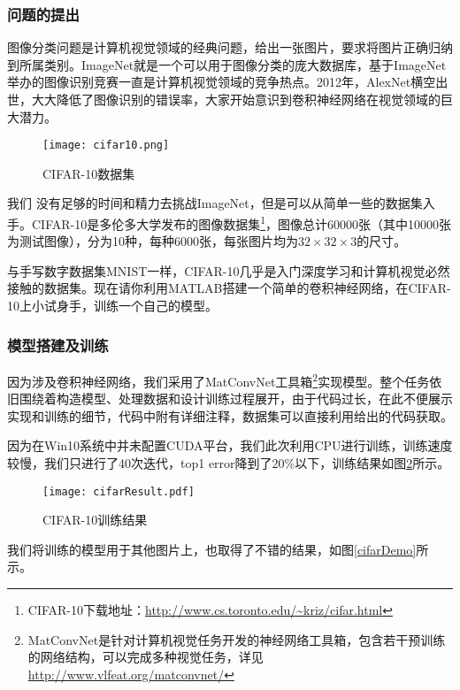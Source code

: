 \documentclass[bwprint]{cumcmthesis}
\begin{document}
\subsubsection{问题的提出}

图像分类问题是计算机视觉领域的经典问题，给出一张图片，要求将图片正确归纳到所属类别。ImageNet就是一个可以用于图像分类的庞大数据库，基于ImageNet举办的图像识别竞赛一直是计算机视觉领域的竞争热点。2012年，AlexNet横空出世，大大降低了图像识别的错误率，大家开始意识到卷积神经网络在视觉领域的巨大潜力。

\begin{figure}[!h]
	\centering
	\texttt{[image: cifar10.png]}
	\caption{CIFAR-10数据集}
	\label{cifar10}
\end{figure}

我们 没有足够的时间和精力去挑战ImageNet，但是可以从简单一些的数据集入手。CIFAR-10是多伦多大学发布的图像数据集\footnote{CIFAR-10下载地址：\url{http://www.cs.toronto.edu/~kriz/cifar.html}}，图像总计60000张（其中10000张为测试图像），分为10种，每种6000张，每张图片均为$32\times32\times3$的尺寸\cite{krizhevsky2009cifar}。

与手写数字数据集MNIST\cite{lecun2010mnist}一样，CIFAR-10几乎是入门深度学习和计算机视觉必然接触的数据集。现在请你利用MATLAB搭建一个简单的卷积神经网络，在CIFAR-10上小试身手，训练一个自己的模型。

\subsubsection{模型搭建及训练}

因为涉及卷积神经网络，我们采用了MatConvNet工具箱\footnote{MatConvNet是针对计算机视觉任务开发的神经网络工具箱，包含若干预训练的网络结构，可以完成多种视觉任务，详见\url{http://www.vlfeat.org/matconvnet/}}实现模型。整个任务依旧围绕着构造模型、处理数据和设计训练过程展开，由于代码过长，在此不便展示实现和训练的细节，代码中附有详细注释，数据集可以直接利用给出的代码获取。

因为在Win10系统中并未配置CUDA平台，我们此次利用CPU进行训练，训练速度较慢，我们只进行了40次迭代，top1 error降到了20\%以下，训练结果如图\ref{cifarResult}所示。

\begin{figure}[!h]
	\centering
	\texttt{[image: cifarResult.pdf]}
	\caption{CIFAR-10训练结果}
	\label{cifarResult}
\end{figure}

我们将训练的模型用于其他图片上，也取得了不错的结果，如图\ref{cifarDemo}所示。
\end{document}
